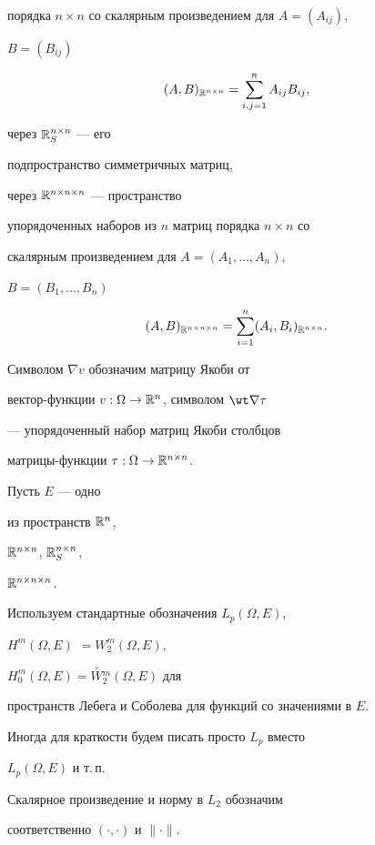 порядка $n\times n$ со скалярным произведением для $A=(A_{ij})$,


$B=(B_{ij})$


$$


(A,B)_{\Bbb{R}^{n\times n}}=\sum\limits_{i,j=1}^{n}


A_{ij}B_{ij},


$$


через $\Bbb{R}^{n\times n}_S$ --- его


подпространство симметричных матриц,


через $\Bbb{R}^{n\times n \times n}$ --- пространство


упорядоченных наборов из $n$ матриц порядка $n\times n$ со


скалярным произведением для $A=(A_1,\dotsc,A_n)$,


$B=(B_1,\dotsc,B_n)$


$$


(A,B)_{\Bbb{R}^{n\times n\times n}}=\sum_{i=1}^{n}


(A_{i},B_{i})_{\Bbb{R}^{n\times n}}.


$$


Символом $\nabla v$ обозначим матрицу Якоби от


вектор-функции $v:\Omega\to\Bbb{R}^n$, символом $\wt\nabla\tau$


--- упорядоченный набор матриц Якоби столбцов


матрицы-функции $\tau:\Omega\to\Bbb{R}^{n\times n}$.





Пусть $E$ --- одно 


из пространств $\Bbb{R}^n$,


$\Bbb{R}^{n\times n}$, $\Bbb{R}^{n\times n}_S$,


$\Bbb{R}^{n\times n \times n}$.


Используем стандартные обозначения $L_p(\Omega,E)$,


$H^m(\Omega,E)$ $=W_2^m(\Omega,E)$,


$H^m_0(\Omega,E)=\overset{\circ}{W}{}_2^m(\Omega,E)$ для


пространств Лебега и Соболева для функций со значениями в $E$.


Иногда для краткости будем писать просто $L_p$ вместо


$L_p(\Omega,E)$ и т.\,п.


Скалярное произведение и норму в $L_2$ обозначим


соответственно $(\cdot,\cdot)$ и $\|\cdot\|$.


